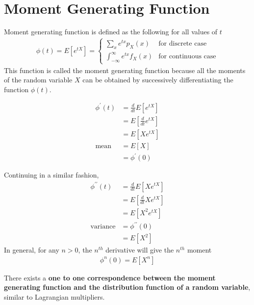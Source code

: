\documentclass[../probability-notes.tex]{subfiles}
\begin{document}
    \chapter{Moment Generating Function}
    Moment generating function is defined as the following for all values of $t$
    \begin{align*}
        \phi (t) = E[e^{tX}] = \begin{cases} \sum_{x} e^{tx} p_{X}(x) &\mbox{for discrete case}\\
        \int_{-\infty}^{\infty} e^{tx} f_{X}(x) &\mbox{for continuous case} \end{cases}
    \end{align*}
    This function is called the moment generating function because all the moments of the random variable $X$ can be obtained by successively differentiating the function $\phi(t)$.\newline

    \begin{align*}
        \phi^{\prime}(t) &= \frac{d}{dt} E[e^{tX}]\\
        &= E[\frac{d}{dt} e^{tX}]\\
        &= E[Xe^{tX}]\\
        \text{mean} &= E[X]\\
        &= \phi^{\prime}(0)
    \end{align*}

    Continuing in a similar fashion,
    \begin{align*}
        \phi^{\prime\prime}(t) &= \frac{d}{dt} E[Xe^{tX}]\\
        &= E[\frac{d}{dt}Xe^{tX}]\\
        &= E[X^{2}e^{tX}]\\
        \text{variance} &= \phi^{\prime\prime}(0)\\
        &= E[X^{2}]
    \end{align*}
    In general, for any $n > 0$, the $n^{th}$ derivative will give the $n^{th}$ moment
    \begin{align*}
        \phi^{n}(0) = E[X^{n}]
    \end{align*}

    There exists a \textbf{one to one correspondence between the moment generating function and the distribution function of a random variable}, similar to Lagrangian multipliers.

\end{document}
